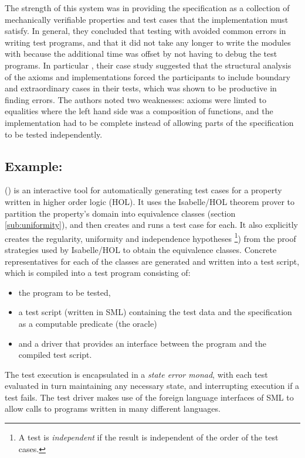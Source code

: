 The strength of this system was in providing the specification as 
a collection of mechanically verifiable properties and test cases that
the implementation must satisfy.
In general, they concluded that 
testing with \DAISTS avoided common errors in writing test programs,
and that it did not take any longer to write the modules with \DAISTS because
the additional time was offset by not having to debug the test programs.
In particular , their case study suggested that the structural analysis of the axioms and implementations
forced the participants to include boundary and extraordinary cases in their tests,
which was shown to be productive in finding errors.
The authors noted two weaknesses: axioms were limted to equalities where 
the left hand side was a composition of functions,
and the implementation had to be complete
instead of allowing parts of the specification to be tested independently.

\subsection{Example: \HOLTG }

\emph{\HOLTG} (\cite{Brucker2012}) is an interactive tool for 
automatically generating test cases for a property written in higher order logic (HOL).
It uses the Isabelle/HOL theorem prover to 
partition the property's domain into equivalence classes (section \ref{sub:uniformity}),
and then creates and runs a test case for each.
It also explicitly creates the regularity, uniformity and independence hypotheses
\footnote{A test is \emph{independent} if the result is independent of the order of the test cases.})
from the proof strategies used by Isabelle/HOL to obtain the equivalence classes.
Concrete representatives for each of the classes
are generated and written into a test script,
which is compiled into a test program consisting of:

\begin{itemize}
\item the program to be tested,
\item a test script (written in SML) containing 
the test data and the specification as a computable predicate (the oracle)
\item and a driver that provides an interface between
the program and the compiled test script.
\end{itemize}

The test execution is encapsulated in a \emph{state error monad},
with each test evaluated in turn maintaining any necessary state,
and interrupting execution if a test fails.
The test driver makes use of the foreign language interfaces of SML
to allow calls to programs written in many different languages.

